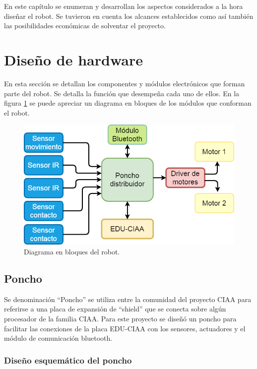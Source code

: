 En este capítulo se enumeran y desarrollan los aspectos considerados a la hora diseñar el robot. Se tuvieron en cuenta los alcances establecidos como así también las posibilidades económicas de solventar el proyecto.
\section{Diseño de hardware}

En esta sección se detallan los componentes y módulos electrónicos que forman parte del robot. Se detalla la función que desempeña cada uno de ellos. En la figura \ref{fig:diagramaini} se puede apreciar un diagrama en bloques de los módulos que conforman el robot.


\begin{figure}[h]
	\centering
	\includegraphics[width=12cm]{./Figures/diagini.PNG}
	\caption{Diagrama en bloques del robot.}
	\label{fig:diagramaini}
\end{figure}



	\subsection{Poncho}
Se denominación  “Poncho”  se utiliza entre la comunidad del proyecto CIAA para referirse a una  placa de expansión de “shield”  que se conecta sobre algún procesador de la familia CIAA.  Para este proyecto se diseñó un poncho para facilitar las conexiones de la placa EDU-CIAA con los sensores, actuadores y el módulo de comunicación bluetooth.

		\subsubsection{Diseño esquemático del poncho}


